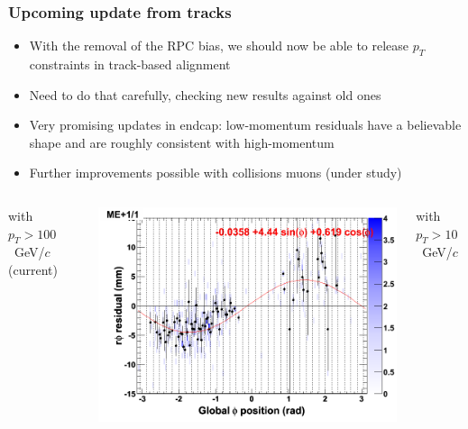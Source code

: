 \documentclass[compress]{beamer}
\begin{document}
\begin{frame}
\frametitle{Upcoming update from tracks}
\begin{itemize}
\item With the removal of the RPC bias, we should now be able to
  release $p_T$ constraints in track-based alignment
\item Need to do that carefully, checking new results against old ones
\item Very promising updates in endcap: low-momentum residuals have a
  believable shape and are roughly consistent with high-momentum
\item Further improvements possible with collisions muons (under study)
\end{itemize}

\vspace{-0.5 cm}
\begin{columns}
\begin{center}
with $p_T > 100$~GeV/$c$ (current)
\end{center}

\vspace{-0.25 cm}
\includegraphics[width=\linewidth]{endcap_highmomentum.png}

\begin{center}
with $p_T > 10$~GeV/$c$
\end{center}


\end{columns}
\end{frame}
\end{document}
